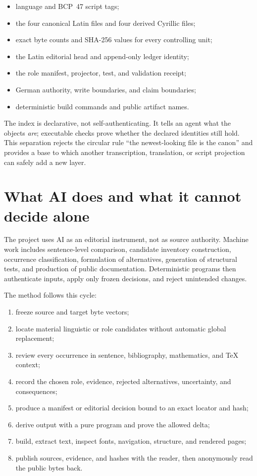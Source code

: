 \documentclass[11pt]{article}
\begin{document}
\begin{itemize}
\item language and BCP~47 script tags;
\item the four canonical Latin files and four derived Cyrillic files;
\item exact byte counts and SHA-256 values for every controlling unit;
\item the Latin editorial head and append-only ledger identity;
\item the role manifest, projector, test, and validation receipt;
\item German authority, write boundaries, and claim boundaries;
\item deterministic build commands and public artifact names.
\end{itemize}

The index is declarative, not self-authenticating. It tells an agent what the objects \emph{are}; executable checks prove whether the declared identities still hold. This separation rejects the circular rule ``the newest-looking file is the canon'' and provides a base to which another transcription, translation, or script projection can safely add a new layer.

\section{What AI does and what it cannot decide alone}

The project uses AI as an editorial instrument, not as source authority. Machine work includes sentence-level comparison, candidate inventory construction, occurrence classification, formulation of alternatives, generation of structural tests, and production of public documentation. Deterministic programs then authenticate inputs, apply only frozen decisions, and reject unintended changes.

The method follows this cycle:

\begin{enumerate}
\item freeze source and target byte vectors;
\item locate material linguistic or role candidates without automatic global replacement;
\item review every occurrence in sentence, bibliography, mathematics, and TeX context;
\item record the chosen role, evidence, rejected alternatives, uncertainty, and consequences;
\item produce a manifest or editorial decision bound to an exact locator and hash;
\item derive output with a pure program and prove the allowed delta;
\item build, extract text, inspect fonts, navigation, structure, and rendered pages;
\item publish sources, evidence, and hashes with the reader, then anonymously read the public bytes back.
\end{enumerate}
\end{document}
